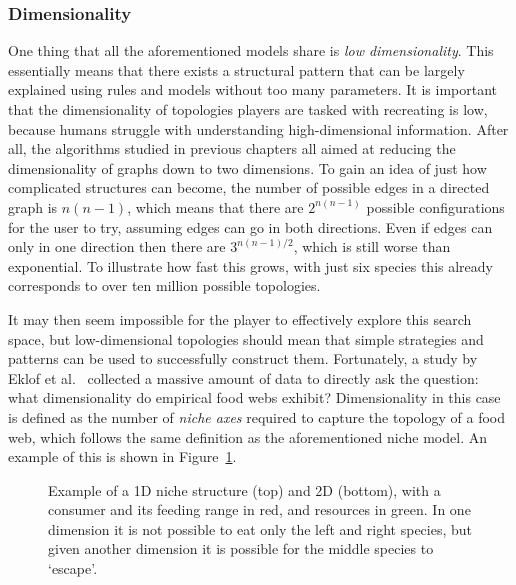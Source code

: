\subsubsection{Dimensionality}
One thing that all the aforementioned models share is \emph{low dimensionality}. This essentially means that there exists a structural pattern that can be largely explained using rules and models without too many parameters.
It is important that the dimensionality of topologies players are tasked with recreating is low, because humans struggle with understanding high-dimensional information. After all, the algorithms studied in previous chapters all aimed at reducing the dimensionality of graphs down to two dimensions. To gain an idea of just how complicated structures can become, the number of possible edges in a directed graph is $n(n-1)$, which means that there are $2^{n(n-1)}$ possible configurations for the user to try, assuming edges can go in both directions. Even if edges can only in one direction then there are $3^{n(n-1)/2}$, which is still worse than exponential. To illustrate how fast this grows, with just six species this already corresponds to over ten million possible topologies.

It may then seem impossible for the player to effectively explore this search space, but low-dimensional topologies should mean that simple strategies and patterns can be used to successfully construct them.
Fortunately, a study by Eklof et al.\ \cite{Eklof2013} collected a massive amount of data to directly ask the question: what dimensionality do empirical food webs exhibit? Dimensionality in this case is defined as the number of \emph{niche axes} required to capture the topology of a food web, which follows the same definition as the aforementioned niche model. An example of this is shown in Figure~\ref{fig:niche}.

\begin{figure}
  \caption[An illustration of food web dimensionality]{Example of a 1D niche structure (top) and 2D (bottom), with a consumer and its feeding range in red, and resources in green.
  In one dimension it is not possible to eat only the left and right species, but given another dimension it is possible for the middle species to `escape'.}
  \label{fig:niche}
\end{figure}


